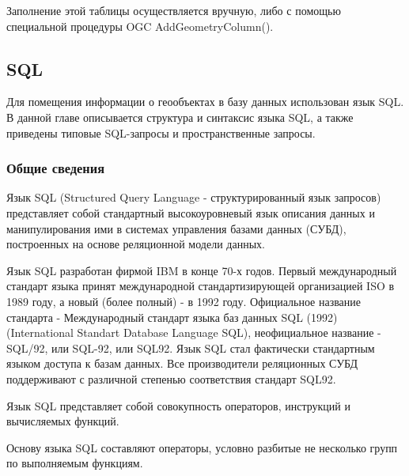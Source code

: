 \documentclass[12pt,a4paper,oneside]{article} %
\begin{document}
Заполнение этой таблицы осуществляется вручную, либо с помощью \linebreak
специальной процедуры OGC AddGeometryColumn().


\newpage
\subsection{SQL}
Для помещения информации о геообъектах в базу данных использован \linebreak
язык SQL. В данной главе описывается структура и синтаксис языка \linebreak
SQL, а также приведены типовые SQL-запросы и пространственные запросы.

\subsubsection{Общие сведения}
Язык SQL (Structured Query Language - структурированный язык запросов) \linebreak
представляет собой стандартный высокоуровневый язык описания данных и \linebreak
манипулирования ими в системах управления базами данных (СУБД), \linebreak
построенных на основе реляционной модели данных.

Язык SQL разработан фирмой IBM в конце 70-х годов. Первый \linebreak
международный стандарт языка принят международной \linebreak
стандартизирующей организацией ISO в 1989 году, а новый \linebreak
(более полный) - в 1992 году. Официальное название стандарта - \linebreak
Международный стандарт языка баз данных SQL (1992) \linebreak
(International Standart Database Language SQL), неофициальное \linebreak
название - SQL/92, или SQL-92, или SQL92. Язык SQL стал \linebreak
фактически стандартным языком доступа к базам данных. Все \linebreak
производители реляционных СУБД поддерживают с различной степенью \linebreak
соответствия стандарт SQL92.

Язык SQL представляет собой совокупность операторов, инструкций \linebreak
и вычисляемых функций.

Основу языка SQL составляют операторы, условно разбитые не несколько \linebreak
групп по выполняемым функциям.
\end{document}
